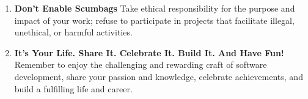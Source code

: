 \documentclass[11pt]{article}
\begin{document}
\begin{enumerate}[label=\arabic*., start=82, itemsep=1ex]
    \item \textbf{Don't Enable Scumbags}
    Take ethical responsibility for the purpose and impact of your work; refuse to participate in projects that facilitate illegal, unethical, or harmful activities.

    \item \textbf{It’s Your Life. Share It. Celebrate It. Build It. And Have Fun!}
    Remember to enjoy the challenging and rewarding craft of software development, share your passion and knowledge, celebrate achievements, and build a fulfilling life and career.
\end{enumerate}

\end{document}

